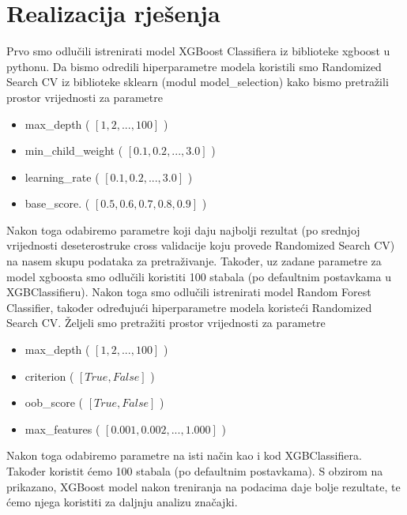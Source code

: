 \documentclass[conference]{IEEEtran}
\begin{document}
\section{Realizacija rješenja}
Prvo smo odlučili istrenirati model XGBoost Classifiera iz biblioteke xgboost u pythonu. Da bismo odredili hiperparametre modela koristili smo Randomized Search CV iz biblioteke sklearn (modul model\_selection) kako bismo pretražili prostor vrijednosti za parametre
\begin{itemize} 
\item max\_depth ( $[1, 2,..., 100]$ )
\item min\_child\_weight ( $[0.1, 0.2,..., 3.0]$ )
\item learning\_rate ( $[0.1, 0.2,..., 3.0]$ )
\item base\_score. ( $[0.5, 0.6, 0.7, 0.8, 0.9] $ )
\end{itemize}
Nakon toga odabiremo parametre koji daju najbolji rezultat (po srednjoj vrijednosti deseterostruke cross validacije koju provede Randomized Search CV) na nasem skupu podataka za pretraživanje. Također, uz zadane parametre za model xgboosta smo odlučili koristiti 100 stabala (po defaultnim postavkama u XGBClassifieru).
Nakon toga smo odlučili istrenirati model Random Forest Classifier, također određujući hiperparametre modela koristeći Randomized Search CV. Željeli smo pretražiti prostor vrijednosti za parametre 
\begin{itemize} 
\item max\_depth ( $[1, 2,..., 100]$ )
\item criterion ( $[True, False]$ )
\item oob\_score ( $[True, False]$ )
\item max\_features ( $[0.001, 0.002,..., 1.000] $ )
\end{itemize}
Nakon toga odabiremo parametre na isti način kao i kod XGBClassifiera. Također koristit ćemo 100 stabala (po defaultnim postavkama).
S obzirom na prikazano, XGBoost model nakon treniranja na podacima daje bolje rezultate, te ćemo njega koristiti za daljnju analizu značajki.
\end{document}
